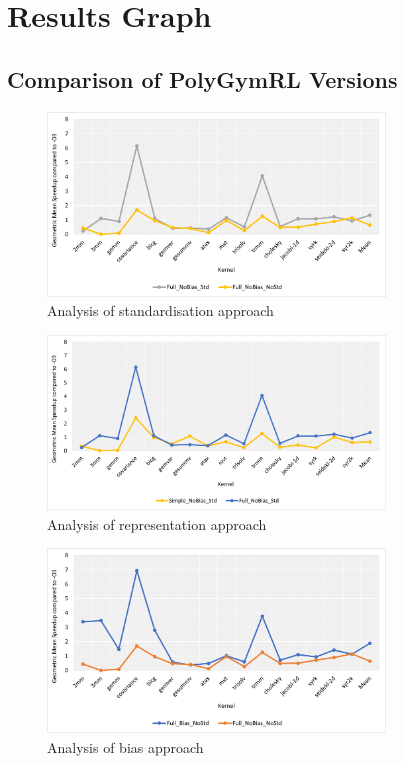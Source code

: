 \documentclass[logo,msc]{infthesis}           %
\begin{document}
\chapter{Results Graph}

\section{Comparison of PolyGymRL Versions}
\label{sec:Compare_Versions}

\begin{figure}[htbp]
  \centering
  \includegraphics[width=0.8\textwidth]{Images/Compare_Std.png}   
  \caption{Analysis of standardisation approach}
  \label{fig:Compare_Std} 
\end{figure}

\begin{figure}[htbp]
  \centering
  \includegraphics[width=0.8\textwidth]{Images/Compare_Rep.png}   
  \caption{Analysis of representation approach}
  \label{fig:Compare_Rep} 
\end{figure}

\begin{figure}[htbp]
  \centering
  \includegraphics[width=0.8\textwidth]{Images/Compare_Bias.png}   
  \caption{Analysis of bias approach}
  \label{fig:Compare_Bias} 
\end{figure}
\end{document}
